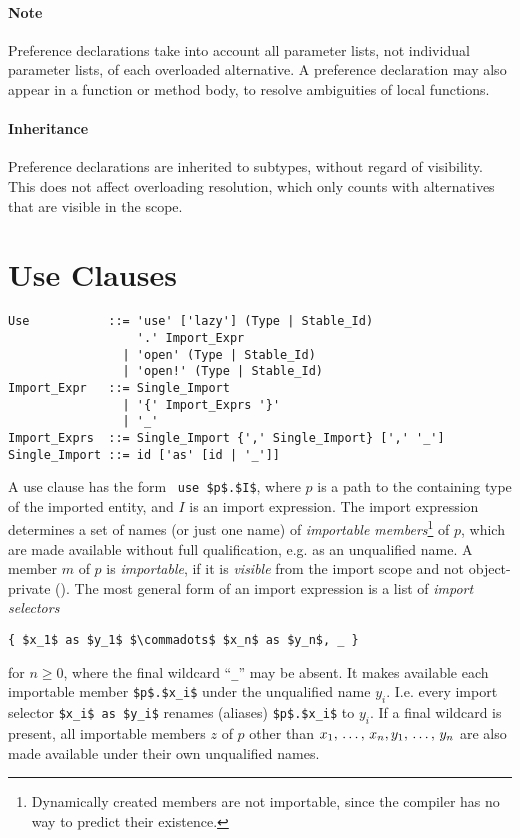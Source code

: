 \paragraph{Note}
Preference declarations take into account all parameter lists, not individual parameter lists, of each overloaded alternative. A preference declaration may also appear in a function or method body, to resolve ambiguities of local functions. 

\paragraph{Inheritance}
Preference declarations are inherited to subtypes, without regard of visibility. This does not affect overloading resolution, which only counts with alternatives that are visible in the scope. 








\section{Use Clauses}
\label{sec:use-clauses}

\syntax\begin{lstlisting}
Use           ::= 'use' ['lazy'] (Type | Stable_Id) 
                  '.' Import_Expr
                | 'open' (Type | Stable_Id)
                | 'open!' (Type | Stable_Id)
Import_Expr   ::= Single_Import
                | '{' Import_Exprs '}'
                | '_'
Import_Exprs  ::= Single_Import {',' Single_Import} [',' '_']
Single_Import ::= id ['as' [id | '_']]
\end{lstlisting}

A use clause has the form ~\lstinline!use $p$.$I$!, where $p$ is a path to the containing type of the imported entity, and $I$ is an import expression. The import expression determines a set of names (or just one name) of {\em importable members}\footnote{Dynamically created members are not importable, since the compiler has no way to predict their existence.} of $p$, which are made available without full qualification, e.g. as an unqualified name. A member $m$ of $p$ is {\em importable}, if it is {\em visible} from the import scope and not object-private (). The most general form of an import expression is a list of {\em import selectors}
\begin{lstlisting}
{ $x_1$ as $y_1$ $\commadots$ $x_n$ as $y_n$, _ }
\end{lstlisting}
for $n \ge 0$, where the final wildcard ``\lstinline!_!'' may be absent. It makes available each importable member \lstinline!$p$.$x_i$! under the unqualified name $y_i$. I.e. every import selector \lstinline!$x_i$ as $y_i$! renames (aliases) \lstinline!$p$.$x_i$! to $y_i$. If a final wildcard is present, all importable members $z$ of $p$ other than $x_1 ,\, \ldots ,\, x_n, y_1 ,\, \ldots ,\, y_n$ are also made available under their own unqualified names. 

